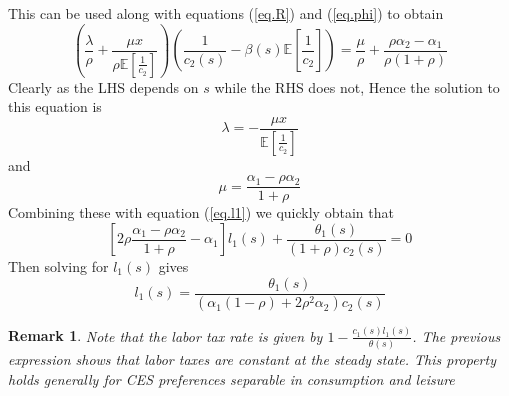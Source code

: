 \documentclass[thmsb,11pt]{article}
\newtheorem{remark}{Remark}
\begin{document}
This can be used along with equations (\ref{eq.R}) and (\ref{eq.phi}) to
obtain
\begin{equation*}
\left(\frac\lambda \rho+\frac{\mu x}{\rho\mathbb{E}[\frac1{c_2}]}%
\right)\left(\frac1{c_2(s)}-\beta(s)\mathbb{E}\left[\frac1{c_2}\right]%
\right) = \frac{\mu}{\rho}+\frac{\rho\alpha_2-\alpha_1}{\rho(1+\rho)}
\end{equation*}
Clearly as the LHS depends on $s$ while the RHS does not, Hence the solution to
this equation is
\begin{equation}
\lambda = - \frac{\mu x}{\mathbb{E}[\frac1{c_2}]}
\end{equation}%
and
\begin{equation}
\mu = \frac{\alpha_1-\rho\alpha_2}{1+\rho}  \label{eq.mu}
\end{equation}
Combining these with equation (\ref{eq.l1}) we quickly obtain that
\begin{equation*}
\left[2\rho\frac{\alpha_1-\rho\alpha_2}{1+\rho}-\alpha_1\right]%
l_1(s)+\frac{\theta_1(s)}{\left(1+\rho\right)c_2(s)} = 0
\end{equation*}%
Then solving for $l_1(s)$ gives
\begin{equation*}
l_1(s) = \frac{\theta_1(s)}{\left(\alpha_1(1-\rho)+2\rho^2\alpha_2\right)c_2(s)}
\end{equation*}

\begin{remark}
Note that the labor tax rate is given by $1-\frac{c_1(s)l_1(s)}{\theta(s)}$. The previous expression shows that labor taxes are constant at the steady state. This property holds generally for CES preferences separable in consumption and leisure
\end{remark}
\end{document}
